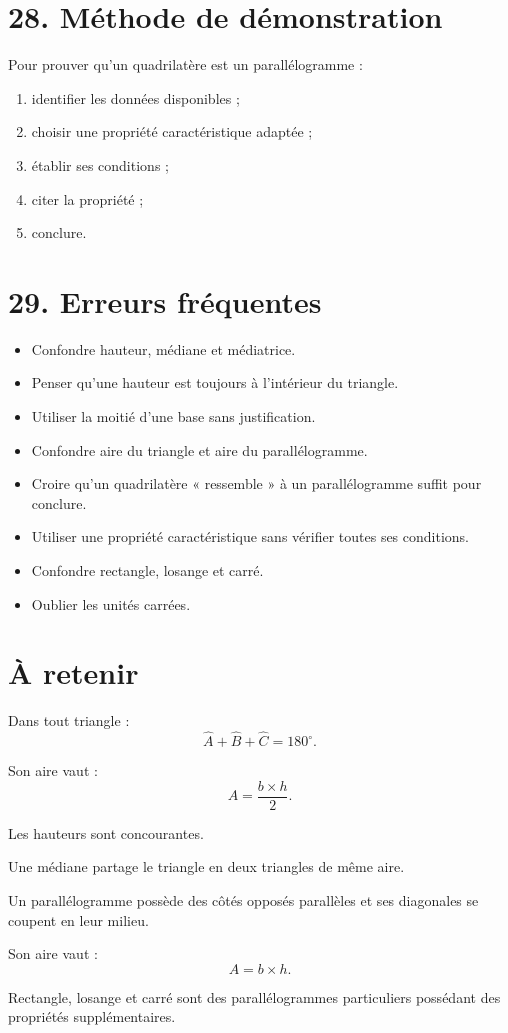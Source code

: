 \section{28. Méthode de démonstration}

\begin{methode}
Pour prouver qu'un quadrilatère est un parallélogramme :
\begin{enumerate}
\item identifier les données disponibles ;
\item choisir une propriété caractéristique adaptée ;
\item établir ses conditions ;
\item citer la propriété ;
\item conclure.
\end{enumerate}
\end{methode}

\section{29. Erreurs fréquentes}

\begin{itemize}
\item Confondre hauteur, médiane et médiatrice.
\item Penser qu'une hauteur est toujours à l'intérieur du triangle.
\item Utiliser la moitié d'une base sans justification.
\item Confondre aire du triangle et aire du parallélogramme.
\item Croire qu'un quadrilatère « ressemble » à un parallélogramme suffit pour conclure.
\item Utiliser une propriété caractéristique sans vérifier toutes ses conditions.
\item Confondre rectangle, losange et carré.
\item Oublier les unités carrées.
\end{itemize}

\section{À retenir}

\begin{aretenir}
Dans tout triangle :
\[
\boxed{\widehat A+\widehat B+\widehat C=180^\circ}.
\]

Son aire vaut :
\[
\boxed{A=\dfrac{b\times h}{2}}.
\]

Les hauteurs sont concourantes.

Une médiane partage le triangle en deux triangles de même aire.

Un parallélogramme possède des côtés opposés parallèles et ses diagonales se coupent en leur milieu.

Son aire vaut :
\[
\boxed{A=b\times h}.
\]

Rectangle, losange et carré sont des parallélogrammes particuliers possédant des propriétés supplémentaires.
\end{aretenir}
